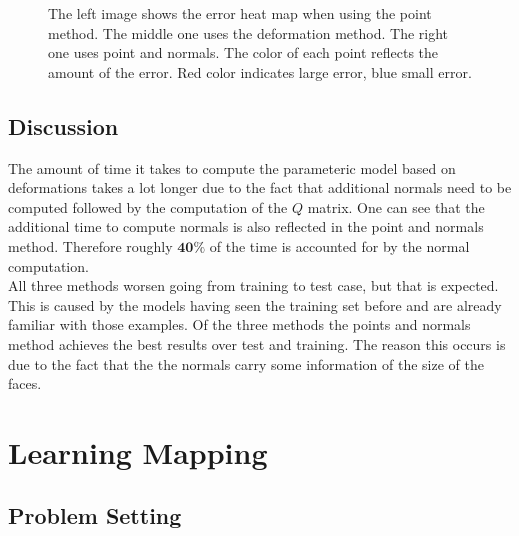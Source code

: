 \begin{figure}
\centering
{}
\caption{The left image shows the error heat map when using the point method. The middle one uses the deformation method. The right one uses point and normals. The color of each point reflects the amount of the error. Red color indicates large error, blue small error.}
\label{fig:PDNheatmap}
\end{figure}

\subsection{Discussion}
The amount of time it takes to compute the parameteric model based on deformations takes a lot longer due to the fact that additional normals need to be computed followed by the computation of the $Q$ matrix. One can see that the additional time to compute normals is also reflected in the point and normals method. Therefore roughly $\mathbf{40\%}$ of the time is accounted for by the normal computation.\\
All three methods worsen going from training to test case, but that is expected. This is caused by the models having seen the training set before and are already familiar with those examples. Of the three methods the points and normals method achieves the best results over test and training. The reason this occurs is due to the fact that the the normals carry some information of the size of the faces.

\section{Learning Mapping}
\subsection{Problem Setting}

